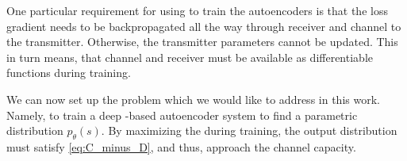 One particular requirement for using  to train the autoencoders is that the loss gradient needs to be backpropagated
all the way through receiver and channel to the transmitter. Otherwise, the transmitter parameters cannot be updated. This in turn means, that channel and receiver must be available as differentiable functions during training.

We can now set up the problem which we would like to address in this work. Namely, to train a deep -based autoencoder system to find a parametric distribution $p_{\theta}(s)$. By maximizing the  during training, the output distribution must satisfy \ref{eq:C_minus_D}, and thus, approach the channel capacity.